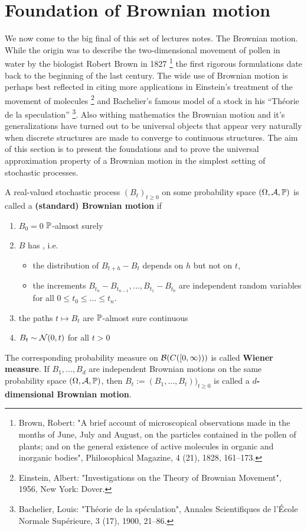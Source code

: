 \section{Foundation of Brownian motion}
We now come to the big final of this set of lectures notes. The Brownian motion. While the origin was to describe the two-dimensional movement of pollen in water by the biologist Robert Brown in 1827 \footnote{Brown, Robert: "{}A brief account of microscopical observations made in the months of June, July and August, on the particles contained in the pollen of plants; and on the general existence of active molecules in organic and inorganic bodies"{}, Philosophical Magazine, 4 (21), 1828, 161–173.} the first rigorous formulations date back to the beginning of the last century. The wide use of Brownian motion is perhaps best reflected in citing more applications in Einstein's treatment of the movement of molecules \footnote{Einstein, Albert: "{}Investigations on the Theory of Brownian Movement"{}, 1956, New York: Dover.} and Bachelier's famous model of a stock in his \enquote{Th\'{e}orie de la speculation} \footnote{Bachelier, Louis: "{}Th\'eorie de la sp\'eculation"{}, Annales Scientifiques de l'École Normale Supérieure, 3 (17), 1900, 21–86.}. Also withing mathematics the Brownian motion and it's generalizations have turned out to be universal objects that appear very naturally when discrete structures are made to converge to continuous structures. The aim of this section is to present the foundations and to prove the universal approximation property of a Brownian motion in the simplest setting of stochastic processes. 
\begin{ldef}
\begin{deff}\label{def_BM}
	A real-valued stochastic process $(B_t)_{t\geq 0}$ on some probability space $(\Omega,\cA,\mathbb{P})$ is called a \textbf{(standard) Brownian motion} if
	\begin{enumerate}[label=(\roman*)]
		\item $B_0 = 0$ $\P$-almost surely
		\item $B$ has \textbf{}, i.e. 
			\begin{itemize}
				\item
				the distribution of $B_{t+h}-B_t$ depends on $h$ but not on $t$,
				\item
				the increments	$B_{t_n} - B_{t_{n-1}},...,B_{t_1} - B_{t_0}$ are independent random variables for all $0 \leq t_0 \leq ...\leq t_n$.
			\end{itemize}
		\item
			the paths $t \mapsto B_t$ are $\P$-almost sure continuous
		\item
			$B_t \sim \cN(0,t)$ for all $t > 0$
	\end{enumerate}
	The corresponding probability measure on $\cB(C([0,\infty)))$ is called \textbf{Wiener measure}. If $B_1,...,B_d$ are independent Brownian motions on the same probability space $(\Omega, \mathcal A, \P)$, then $B_t:=(B_1,...,B_t))_{t\geq 0}$ is called a \textbf{$d$-dimensional Brownian motion}.
\end{deff}
\end{ldef}
